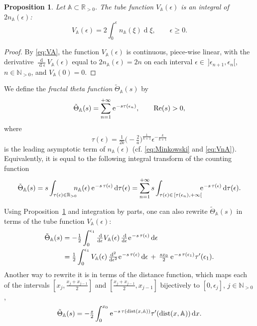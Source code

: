 \documentclass[a4paper,11pt]{amsart}
\numberwithin{equation}{section}
\newcommand{\N}{{\mathbb N}}
\newcommand{\R}{{\mathbb R}}
\newcommand{\re}{\operatorname{Re}}
\renewcommand{\d}{\ensuremath{\operatorname{d}\!}}
\newcommand{\e}{\ensuremath{\mkern.25\thinmuskip\mathrm{e}\mkern.4\thinmuskip}}
\newcommand{\orbit}{\mathbb{A}}
\newcommand{\dist}{\operatorname{dist}}
\newtheorem{proposition}[theorem]{Proposition}
\theoremstyle{definition}
\begin{document}
\begin{proposition}\label{prop:tubefunction}
Let $\orbit\subset\R_{>0}$. The tube function $V_\orbit(\epsilon)$ is an integral of $2n_\orbit(\epsilon)$:	
	\begin{equation}\label{eq:VnA}
		V_\orbit(\epsilon)=2\int_0^\epsilon n_\orbit(\xi)\d\xi,\qquad \epsilon\geq 0.	
	\end{equation}
\end{proposition}
\begin{proof}
By \eqref{eq:VA}, the function $V_\orbit(\epsilon)$ is continuous, piece-wise linear, with the derivative $\frac{\d}{\d\epsilon}V_\orbit(\epsilon)$ equal to $2n_\orbit(\epsilon)=2n$ on each interval $\epsilon\in\ ]\epsilon_{n+1},\epsilon_n[$,	$n\in\N_{>0}$, and $V_\orbit(0)=0$. %
\end{proof}



We define the \emph{fractal theta function} $\tilde{\Theta}_\orbit(s)$ by
\begin{equation}\label{eq:tildeTheta}
\tilde{\Theta}_\orbit(s)=\sum_{n=1}^{+\infty}\e^{-s\tau(\epsilon_n)},\qquad \re(s)>0,
\end{equation}
where 
\begin{equation}\label{eq:tau}
	\tau(\epsilon)=\tfrac{1}{2k}\big(\!-\!\tfrac{2}{a}\big)^{\frac1{k+1}}\epsilon^{-\frac{k}{k+1}}
\end{equation}
is the leading asymptotic term of $n_\orbit(\epsilon)$ (cf. \eqref{eq:Minkowski} and \eqref{eq:VnA}).
Equivalently, it is equal to the following integral transform of the counting function
\begin{equation*}
		\tilde{\Theta}_\orbit(s)=s\int_{\tau(\epsilon)\in\R_{>0}}\!\!\!\!n_\orbit(\epsilon)\,\e^{-s\,\tau(\epsilon)}\d\tau(\epsilon)=
		\sum_{n=1}^{+\infty}s\int_{\tau(\epsilon)\in\,[\tau(\epsilon_n),+\infty[}\!\!\!\e^{-s\,\tau(\epsilon)}\d\tau(\epsilon).
\end{equation*}

Using Proposition~\ref{prop:tubefunction} and integration by parts, one can also rewrite  $\tilde\Theta_\orbit(s)$ in terms of the tube function $V_\orbit(\epsilon)$:
\begin{equation*}\label{eq:ftf}
\begin{aligned}
\tilde{\Theta}_\orbit(s)&=-\tfrac12 \int_0^{\epsilon_1} \tfrac{\d}{\d\epsilon} V_\orbit(\epsilon)\,\tfrac{\d}{\d\epsilon}\e^{-s\,\tau(\epsilon)}\d\epsilon\\
&=\tfrac12 \int_0^{\epsilon_1} V_\orbit(\epsilon)\,\tfrac{\d^2}{\d\epsilon^2}\e^{-s\,\tau(\epsilon)}\d\epsilon
	\, + \,\tfrac{sx_0}{2}\, \e^{-s\,\tau(\epsilon_1)}{\tau}'(\epsilon_1). 
\end{aligned}	
\end{equation*}
Another way to rewrite it is in terms of the distance function, 
which maps each of the intervals $[x_j,\frac{x_j+x_{j-1}}{2}]$ and $[\frac{x_j+x_{j-1}}{2},x_{j-1}]$ bijectively to
$[0,\epsilon_j]$, $j\in\N_{>0}$, 
\begin{equation}
\tilde{\Theta}_\orbit(s)=-\tfrac{s}{2}\int_0^{x_0} \e^{-s\,\tau(\dist(x,\orbit))} {\tau}'(\dist(x,\orbit))\d x.	
\end{equation}
\end{document}
